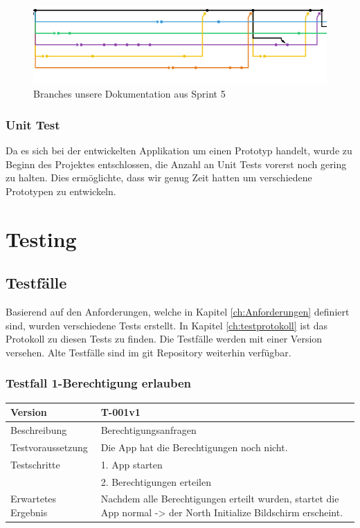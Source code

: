 \documentclass[a4paper]{scrreprt}
\begin{document}
\begin{figure}[h!]
	\center
	\includegraphics[width=\textwidth]{GitFeatureBranchWorkflow.png}
	\caption{Branches unsere Dokumentation aus Sprint 5}
	\label{fig:FeatureBranchWorkflow}
\end{figure}

\subsubsection{Unit Test}
Da es sich bei der entwickelten Applikation um einen Prototyp handelt, wurde zu Beginn des Projektes entschlossen, die Anzahl an Unit Tests vorerst noch gering zu halten. Dies ermöglichte, dass wir genug Zeit hatten um verschiedene Prototypen zu entwickeln.

\section{Testing}

\subsection{Testfälle}
Basierend auf den Anforderungen, welche in Kapitel \ref{ch:Anforderungen} definiert sind, wurden verschiedene Tests erstellt. In Kapitel \ref{ch:testprotokoll} ist das Protokoll zu diesen Tests zu finden. Die Testfälle werden mit einer Version versehen. Alte Testfälle sind im git Repository weiterhin verfügbar.

\subsubsection{Testfall 1-Berechtigung erlauben}
\begin{tabularx}{\textwidth}{|l|X|}
\hline
	Version &
	T-001v1 \\
\hline
	Beschreibung & Berechtigungsanfragen \\
\hline
	Testvoraussetzung & Die App hat die Berechtigungen noch nicht. \\
\hline
	Testschritte &
		1. App starten \\ &
		2. Berechtigungen erteilen \\
\hline
	Erwartetes Ergebnis & Nachdem alle Berechtigungen erteilt wurden, startet die App normal -> der North Initialize Bildschirm erscheint. \\
\hline
\end{tabularx}
\end{document}

